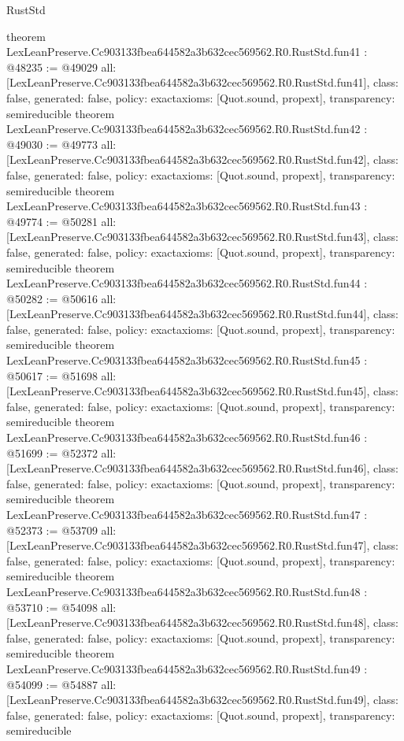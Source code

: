 \begin{lexlean}{RustStd}
\begin{coremodule}
{}
theorem LexLeanPreserve.Cc903133fbea644582a3b632cec569562.R0.RustStd.fun41 : @48235 := @49029 {
  all: [LexLeanPreserve.Cc903133fbea644582a3b632cec569562.R0.RustStd.fun41],
  class: false,
  generated: false,
  policy: exact{axioms: [Quot.sound, propext]},
  transparency: semireducible
}
theorem LexLeanPreserve.Cc903133fbea644582a3b632cec569562.R0.RustStd.fun42 : @49030 := @49773 {
  all: [LexLeanPreserve.Cc903133fbea644582a3b632cec569562.R0.RustStd.fun42],
  class: false,
  generated: false,
  policy: exact{axioms: [Quot.sound, propext]},
  transparency: semireducible
}
theorem LexLeanPreserve.Cc903133fbea644582a3b632cec569562.R0.RustStd.fun43 : @49774 := @50281 {
  all: [LexLeanPreserve.Cc903133fbea644582a3b632cec569562.R0.RustStd.fun43],
  class: false,
  generated: false,
  policy: exact{axioms: [Quot.sound, propext]},
  transparency: semireducible
}
theorem LexLeanPreserve.Cc903133fbea644582a3b632cec569562.R0.RustStd.fun44 : @50282 := @50616 {
  all: [LexLeanPreserve.Cc903133fbea644582a3b632cec569562.R0.RustStd.fun44],
  class: false,
  generated: false,
  policy: exact{axioms: [Quot.sound, propext]},
  transparency: semireducible
}
theorem LexLeanPreserve.Cc903133fbea644582a3b632cec569562.R0.RustStd.fun45 : @50617 := @51698 {
  all: [LexLeanPreserve.Cc903133fbea644582a3b632cec569562.R0.RustStd.fun45],
  class: false,
  generated: false,
  policy: exact{axioms: [Quot.sound, propext]},
  transparency: semireducible
}
theorem LexLeanPreserve.Cc903133fbea644582a3b632cec569562.R0.RustStd.fun46 : @51699 := @52372 {
  all: [LexLeanPreserve.Cc903133fbea644582a3b632cec569562.R0.RustStd.fun46],
  class: false,
  generated: false,
  policy: exact{axioms: [Quot.sound, propext]},
  transparency: semireducible
}
theorem LexLeanPreserve.Cc903133fbea644582a3b632cec569562.R0.RustStd.fun47 : @52373 := @53709 {
  all: [LexLeanPreserve.Cc903133fbea644582a3b632cec569562.R0.RustStd.fun47],
  class: false,
  generated: false,
  policy: exact{axioms: [Quot.sound, propext]},
  transparency: semireducible
}
theorem LexLeanPreserve.Cc903133fbea644582a3b632cec569562.R0.RustStd.fun48 : @53710 := @54098 {
  all: [LexLeanPreserve.Cc903133fbea644582a3b632cec569562.R0.RustStd.fun48],
  class: false,
  generated: false,
  policy: exact{axioms: [Quot.sound, propext]},
  transparency: semireducible
}
theorem LexLeanPreserve.Cc903133fbea644582a3b632cec569562.R0.RustStd.fun49 : @54099 := @54887 {
  all: [LexLeanPreserve.Cc903133fbea644582a3b632cec569562.R0.RustStd.fun49],
  class: false,
  generated: false,
  policy: exact{axioms: [Quot.sound, propext]},
  transparency: semireducible
}
\end{coremodule}
\end{lexlean}
